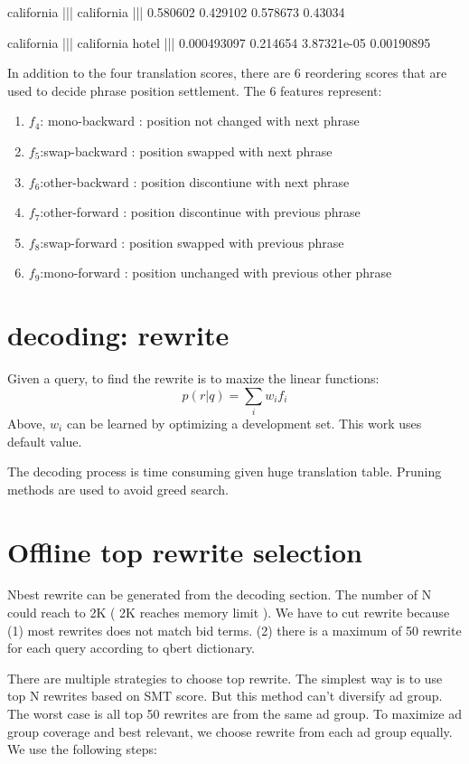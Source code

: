 \documentclass{sig-alternate}
\begin{document}
california ||| california ||| 0.580602 0.429102 0.578673 0.43034 

california ||| california hotel ||| 0.000493097 0.214654 3.87321e-05 0.00190895


In addition to the four translation scores, there are 6 reordering scores that are used to decide phrase position settlement. The 6 features represent: 
\begin{enumerate}
\item $f_{4}$: mono-backward : position not changed with next phrase
\item $f_{5}$:swap-backward : position swapped with next phrase
\item $f_{6}$:other-backward : position discontiune with next  phrase
\item $f_{7}$:other-forward : position discontinue with previous  phrase
\item $f_{8}$:swap-forward : position swapped with previous  phrase
\item $f_{9}$:mono-forward : position unchanged with previous other phrase
\end{enumerate}  
   
\section{decoding: rewrite}

Given a query, to find the rewrite is to maxize the linear functions:
$$
p(r|q)=\sum_{i}w_{i}f_{i}
$$
Above, $w_{i}$ can be learned by optimizing a development set. This work uses default value.

The decoding process is time consuming given huge translation table. Pruning methods are used to avoid greed search.
 

\section{Offline top rewrite selection}
\label{sec:toprewrite}
Nbest rewrite can be generated from the decoding section. The number of N could reach to 2K ( 2K reaches  memory limit ). We have to cut rewrite because (1) most rewrites does not match bid terms. (2) there is a maximum of 50 rewrite for each query according to qbert dictionary.

There are multiple strategies to choose top rewrite. The simplest way is to use top N rewrites based on SMT score. But this method can't diversify ad group. The worst case is all top 50 rewrites are from the same ad group. 
To maximize ad group coverage and best relevant, we choose rewrite from each ad group equally. We use the following steps:
\end{document}
